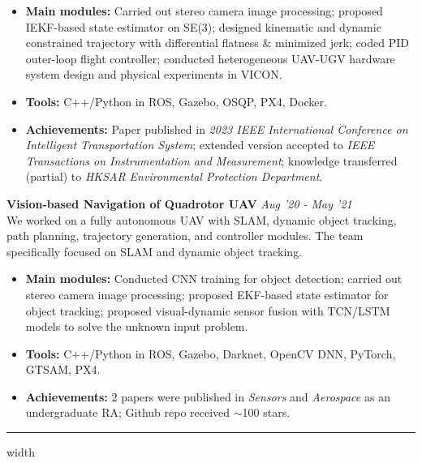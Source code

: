 \documentclass[overlapped]{res}
\begin{document}
\begin{resume}
\begin{itemize}
  \item \textbf{Main modules:} Carried out stereo camera image processing; proposed IEKF-based state estimator on SE(3); designed kinematic and dynamic constrained trajectory with differential flatness \& minimized jerk; coded PID outer-loop flight controller; conducted heterogeneous UAV-UGV hardware system design and physical experiments in VICON.
  \item \textbf{Tools:} C++/Python in ROS, Gazebo, OSQP, PX4, Docker.
  \item \textbf{Achievements:} Paper published in \textit{2023 IEEE International Conference on Intelligent Transportation System}; extended version accepted to \textit{IEEE Transactions on Instrumentation and Measurement}; knowledge transferred (partial) to \textit{HKSAR Environmental Protection Department}.
\end{itemize}



\textbf{Vision-based Navigation of Quadrotor UAV} 
\hfill \textit{Aug '20 - May  '21} \\
We worked on a fully autonomous UAV with SLAM, dynamic object tracking, path planning, trajectory generation, and controller modules. The team specifically focused on SLAM and dynamic object tracking.

\begin{itemize}
  \item \textbf{Main modules:} Conducted CNN training for object detection; carried out stereo camera image processing; proposed EKF-based state estimator for object tracking; proposed visual-dynamic sensor fusion with TCN/LSTM models to solve the unknown input problem.
  \item \textbf{Tools:} C++/Python in ROS, Gazebo, Darknet, OpenCV DNN, PyTorch, GTSAM, PX4.
  \item \textbf{Achievements:} 2 papers were published in \textit{Sensors} and \textit{Aerospace} as an undergraduate RA; Github repo received $\sim$100 stars.
\end{itemize}
\par\noindent\hrule width \linewidth %


\end{resume}
\end{document}
